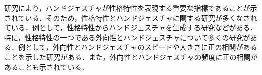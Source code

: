 研究により，ハンドジェスチャが性格特性を表現する重要な指標であることが示されている\cite{ハンドジェスチャ指標1}\cite{ハンドジェスチャ指標2}\cite{ハンドジェスチャ指標3}．そのため，性格特性とハンドジェスチャに関する研究が多くなされている．例として，性格特性からハンドジェスチャを生成する研究などがある\cite{ジェスチャ生成}．特に，性格特性の一つである外向性とハンドジェスチャについて多くの研究がある．例として，外向性とハンドジェスチャのスピードや大きさに正の相関があることを示した研究がある\cite{ハンドジェスチャ指標1}\cite{ハンドジェスチャ指標3}．また，外向性とハンドジェスチャの頻度に正の相関があることも示されている\cite{ジェスチャ生成}\cite{ハンドジェスチャ外向性}．









\vspace{1cm}
\begin{figure}[!h]
 \begin{center}
  \centering
  \label{fig:kansei}
 \end{center}
\end{figure}

